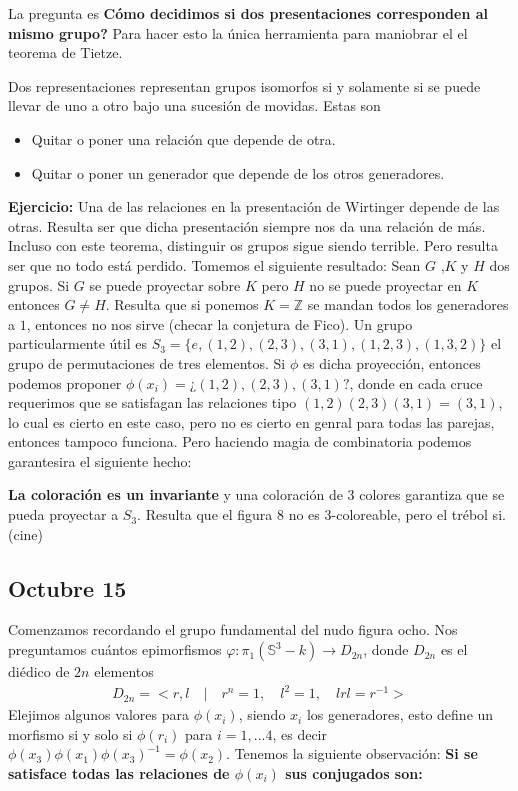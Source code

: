 \documentclass{article}
\theoremstyle{mytheoremstyle}
\theoremstyle{mytheoremstyle}
\theoremstyle{myproblemstyle}
\begin{document}
    La pregunta es \textbf{Cómo decidimos si dos presentaciones corresponden al mismo grupo?} Para hacer esto la única herramienta para maniobrar el el teorema de Tietze. 

    \begin{theorem}
      Dos representaciones representan grupos isomorfos si y solamente si se puede llevar de uno a otro bajo una sucesión de movidas. Estas son 
      \begin{itemize}
        \item Quitar o poner una relación que depende de otra.
        \item Quitar o poner un generador que depende de los otros generadores.
      \end{itemize}
    \end{theorem}
  \textbf{Ejercicio: }Una de las relaciones en la presentación de Wirtinger depende de las otras. Resulta ser que dicha presentación siempre nos da una relación de más.
  Incluso con este teorema, distinguir os grupos sigue siendo terrible. Pero resulta ser que no todo está perdido. Tomemos el siguiente resultado: Sean $G$ ,$K$ y $H$ dos grupos. Si $G$ se puede proyectar sobre $K$ pero $H$ no se puede proyectar en $K$ entonces $G\neq H$. Resulta que si ponemos $K=\mathbb{Z}$ se mandan todos los generadores a $1$, entonces no nos sirve (checar la conjetura de Fico).
Un grupo particularmente útil es $S_3=\{e, (1,2),(2,3),(3,1),(1,2,3),(1,3,2)\}$ el grupo de permutaciones de tres elementos. Si $\phi$ es dicha proyección, entonces podemos proponer $\phi(x_i)=¿(1,2), (2,3),(3,1)?$, donde en cada cruce requerimos que se satisfagan las relaciones tipo $(1,2)(2,3)(3,1)=(3,1)$, lo cual es cierto en este caso, pero no es cierto en genral para todas las parejas, entonces tampoco funciona. Pero haciendo magia de combinatoria podemos garantesira el siguiente hecho:

\textbf{La coloración es un invariante} y una coloración de 3 colores garantiza que se pueda proyectar a $S_3$. Resulta que el figura 8 no es 3-coloreable, pero el trébol si. (cine)

\subsection{Octubre 15}
Comenzamos recordando el grupo fundamental del nudo figura ocho. Nos preguntamos cuántos epimorfismos $\varphi: \pi_1(\mathbb{S}^3 -k) \to D_{2n}$, donde $D_{2n}$ es el diédico de $2n$ elementos
\begin{align}
  D_{2n}=<r,l \quad |\quad r^n=1, \quad l^2=1,\quad  lrl=r^{-1}>
\end{align}
Elejimos algunos valores para $\phi(x_i)$, siendo $x_i$ los generadores, esto define un morfismo si y solo si $\phi(r_i)$ para $i=1,...4$, es decir 
$\phi(x_3)\phi(x_1)\phi(x_3)^{-1}=\phi(x_2)$. Tenemos la siguiente observación: \textbf{Si se satisface todas las relaciones de $\phi(x_i)$ sus conjugados son:}
\end{document}
